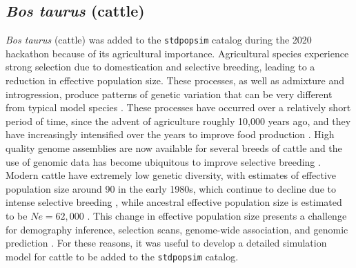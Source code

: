 \documentclass[hidelinks]{article}
\newcommand{\stdpopsim}{\texttt{stdpopsim}\xspace}
\begin{document}
\hypertarget{bos-taurus}{%
	\subsection*{\texorpdfstring{\emph{Bos
				taurus} (cattle)}{Bos taurus (cattle)}}\label{bos-taurus}}

\emph{Bos taurus} (cattle) was added to the \texttt{\stdpopsim} catalog during the 2020 hackathon because of its agricultural importance. Agricultural species experience
strong selection due to domestication and selective breeding, leading
to a reduction in effective population size. These processes,
as well as admixture and introgression, produce patterns
of genetic variation that can be very different from typical model
species \citep{Larson2013}. These processes have occurred over a
relatively short period of time, since the advent of agriculture roughly 10,000 years ago, and they have increasingly intensified over the years to improve food production \citep{Gaut2018,MacLeod2013}. High quality genome assemblies are now
available for several breeds of cattle \citep[e.g.,][]{Rosen2020, Heaton2021,
Talenti2022} and the use of genomic data has become ubiquitous to
improve selective breeding \citep{Meuwissen2001,
MacLeod2014, Obsteter2021, Cesarani2022}. Modern cattle have extremely low genetic diversity,
with estimates of effective population size around 90 in the early 1980s, which continue to decline due to intense selective breeding \citep{MacLeod2013, VanRaden2020, Makanjouloa2020}, while ancestral effective population size is estimated to be $Ne=62,000$ \citep{MacLeod2013}. This change in effective population size presents a challenge for demography inference, selection scans, genome-wide association, and genomic prediction
\citep{MacLeod2013,MacLeod2014,Hartfield2022}. For these reasons, it was useful to develop a detailed simulation model for cattle to be added to the \texttt{\stdpopsim} catalog.
\end{document}
